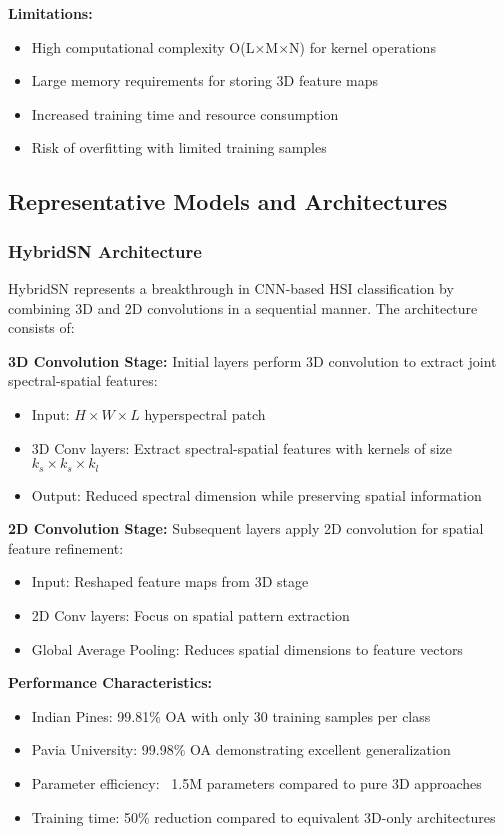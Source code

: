 \documentclass[journal]{IEEEtran}
\begin{document}
\textbf{Limitations:}
\begin{itemize}
\item High computational complexity O(L×M×N) for kernel operations
\item Large memory requirements for storing 3D feature maps
\item Increased training time and resource consumption
\item Risk of overfitting with limited training samples
\end{itemize}

\subsection{Representative Models and Architectures}

\subsubsection{HybridSN Architecture}

HybridSN \cite{roy2020hybridsn} represents a breakthrough in CNN-based HSI classification by combining 3D and 2D convolutions in a sequential manner. The architecture consists of:

\textbf{3D Convolution Stage:} Initial layers perform 3D convolution to extract joint spectral-spatial features:
\begin{itemize}
\item Input: $H \times W \times L$ hyperspectral patch
\item 3D Conv layers: Extract spectral-spatial features with kernels of size $k_s \times k_s \times k_l$
\item Output: Reduced spectral dimension while preserving spatial information
\end{itemize}

\textbf{2D Convolution Stage:} Subsequent layers apply 2D convolution for spatial feature refinement:
\begin{itemize}
\item Input: Reshaped feature maps from 3D stage
\item 2D Conv layers: Focus on spatial pattern extraction
\item Global Average Pooling: Reduces spatial dimensions to feature vectors
\end{itemize}

\textbf{Performance Characteristics:}
\begin{itemize}
\item Indian Pines: 99.81\% OA with only 30 training samples per class
\item Pavia University: 99.98\% OA demonstrating excellent generalization
\item Parameter efficiency: ~1.5M parameters compared to pure 3D approaches
\item Training time: 50\% reduction compared to equivalent 3D-only architectures
\end{itemize}
\end{document}
